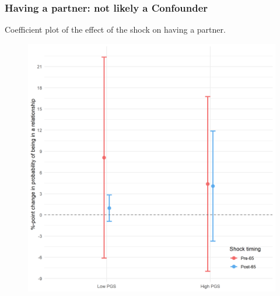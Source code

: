 \documentclass[10pt,compress,xcolor=dvipsnames]{beamer}    %
\newcounter{ex}
\newcommand{\1}[1]{\mathrm{1\hspace*{-2.5pt}l}[#1]}	%
\begin{document}
\begin{frame}
\frametitle{Having a partner: not likely a Confounder}
Coefficient plot of the effect of the shock on having a partner.
\begin{figure}[hbtp]
\centering
\includegraphics[height=0.8\textheight]{../../3_output/shock_effects/mpart_6070_100_cvplot.png}
\label{fig:mpart}
\end{figure}
\end{frame}
\end{document}
